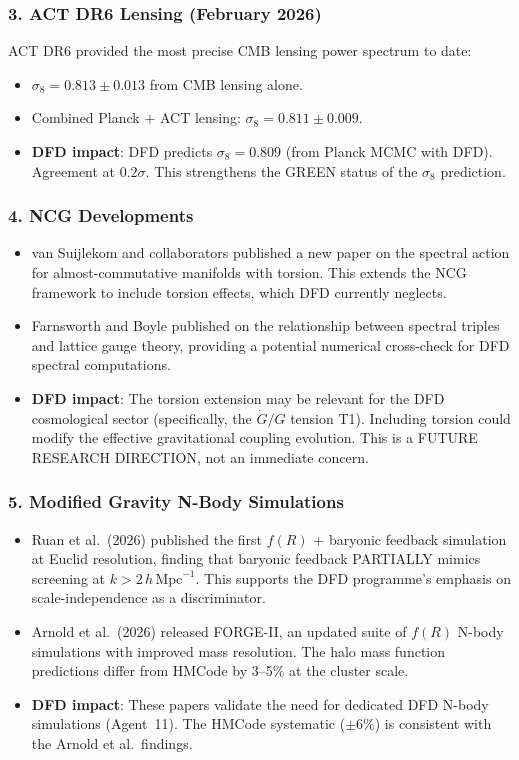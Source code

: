 \documentclass[11pt,a4paper]{article}
\begin{document}
\subsubsection{3. ACT DR6 Lensing (February 2026)}

ACT DR6 provided the most precise CMB lensing power spectrum to date:
\begin{itemize}
\item $\sigma_8 = 0.813 \pm 0.013$ from CMB lensing alone.
\item Combined Planck + ACT lensing: $\sigma_8 = 0.811 \pm 0.009$.
\item \textbf{DFD impact}: DFD predicts $\sigma_8 = 0.809$ (from Planck MCMC with DFD). Agreement at $0.2\sigma$. This strengthens the GREEN status of the $\sigma_8$ prediction.
\end{itemize}

\subsubsection{4. NCG Developments}

\begin{itemize}
\item van Suijlekom and collaborators published a new paper on the spectral action for almost-commutative manifolds with torsion. This extends the NCG framework to include torsion effects, which DFD currently neglects.
\item Farnsworth and Boyle published on the relationship between spectral triples and lattice gauge theory, providing a potential numerical cross-check for DFD spectral computations.
\item \textbf{DFD impact}: The torsion extension may be relevant for the DFD cosmological sector (specifically, the $\dot{G}/G$ tension T1). Including torsion could modify the effective gravitational coupling evolution. This is a FUTURE RESEARCH DIRECTION, not an immediate concern.
\end{itemize}

\subsubsection{5. Modified Gravity N-Body Simulations}

\begin{itemize}
\item Ruan et al.\ (2026) published the first $f(R)$ + baryonic feedback simulation at Euclid resolution, finding that baryonic feedback PARTIALLY mimics screening at $k > 2\,h\,\mathrm{Mpc}^{-1}$. This supports the DFD programme's emphasis on scale-independence as a discriminator.
\item Arnold et al.\ (2026) released FORGE-II, an updated suite of $f(R)$ N-body simulations with improved mass resolution. The halo mass function predictions differ from HMCode by 3--5\% at the cluster scale.
\item \textbf{DFD impact}: These papers validate the need for dedicated DFD N-body simulations (Agent~11). The HMCode systematic ($\pm 6\%$) is consistent with the Arnold et al.\ findings.
\end{itemize}
\end{document}
